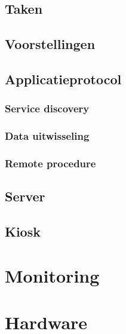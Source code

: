 \section{Taken}

\section{Voorstellingen}

\section{Applicatieprotocol}

\subsection{Service discovery}

\subsection{Data uitwisseling}

\subsection{Remote procedure}

\section{Server}

\section{Kiosk}


%
%

\chapter{Monitoring}
\label{chap:monitoring}


%
%

\chapter{Hardware}
\label{chap:hardware}

